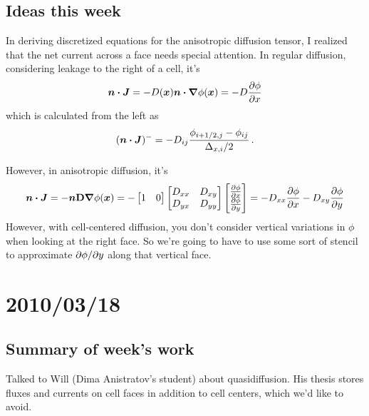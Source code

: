 \documentclass[11pt]{SRJresearch}
\begin{document}
\subsection{Ideas this week}
In deriving discretized equations for the anisotropic diffusion tensor, I
realized that the net current across a face needs special attention. In regular
diffusion, considering leakage to the right of a cell, it's
\begin{equation*}
  \bm{n} \bm{\cdot} \bm{J} = - D(\bm{x}) \bm{n} \bm{\cdot} \bm{\nabla} \phi(\bm{x}) 
  = -D \frac{\partial \phi}{\partial x}
\end{equation*}
which is calculated from the left as
\begin{equation*}
  (\bm{n} \bm{\cdot} \bm{J})^- = -D_{ij} \frac{\phi_{i+1/2,j} -
  \phi_{ij}}{\Delta_{x,i} /2} \,.
\end{equation*}

However, in anisotropic diffusion, it's 
\begin{equation*}
  \bm{n} \bm{\cdot} \bm{J} = - \bm{n} \mathbf{D} \bm{\nabla} \phi(\bm{x}) 
  = -
  \begin{bmatrix} 1 & 0 \end{bmatrix}
  \begin{bmatrix}
    D_{xx} & D_{xy} \\ 
    D_{yx} & D_{yy}
  \end{bmatrix}
  \begin{bmatrix}
    \frac{\partial \phi}{\partial x} \\
    \frac{\partial \phi}{\partial y}
  \end{bmatrix}
  = - D_{xx} \frac{\partial \phi}{\partial x} - D_{xy} \frac{\partial \phi}{\partial y}
\end{equation*}
However, with cell-centered diffusion, you don't consider vertical variations
in $\phi$ when looking at the right face. So we're going to have to use some
sort of stencil to approximate ${\partial \phi}/{\partial y}$ along that vertical face.

\section{2010/03/18}

\subsection{Summary of week's work}
Talked to Will (Dima Anistratov's student) about quasidiffusion. His thesis
\cite{Wie2009} stores fluxes and currents on cell faces in addition to cell
centers, which we'd like to avoid.
\end{document}
